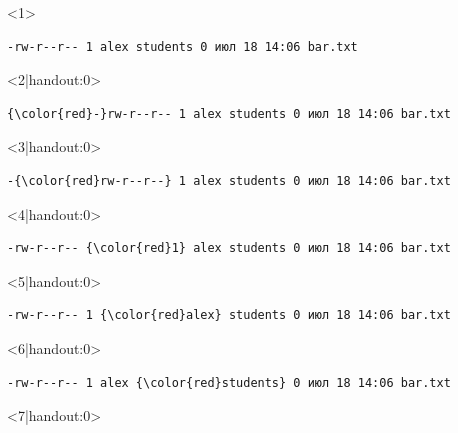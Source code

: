 \documentclass{beamer}
\begin{document}
\begin{frame}[fragile]
	\begin{onlyenv}
		\begin{Verbatim}[commandchars=\\\{\},codes={\catcode`$=3\catcode`^=7\catcode`_=8}]
-rw-r--r-- 1 alex students 0 июл 18 14:06 bar.txt
		\end{Verbatim}
	\end{onlyenv}
	\begin{onlyenv}<2|handout:0>
		\begin{Verbatim}[commandchars=\\\{\},codes={\catcode`$=3\catcode`^=7\catcode`_=8}]
{\color{red}-}rw-r--r-- 1 alex students 0 июл 18 14:06 bar.txt
		\end{Verbatim}
	\end{onlyenv}
	\begin{onlyenv}<3|handout:0>
		\begin{Verbatim}[commandchars=\\\{\},codes={\catcode`$=3\catcode`^=7\catcode`_=8}]
-{\color{red}rw-r--r--} 1 alex students 0 июл 18 14:06 bar.txt
		\end{Verbatim}
	\end{onlyenv}
	\begin{onlyenv}<4|handout:0>
		\begin{Verbatim}[commandchars=\\\{\},codes={\catcode`$=3\catcode`^=7\catcode`_=8}]
-rw-r--r-- {\color{red}1} alex students 0 июл 18 14:06 bar.txt
		\end{Verbatim}
	\end{onlyenv}
	\begin{onlyenv}<5|handout:0>
		\begin{Verbatim}[commandchars=\\\{\},codes={\catcode`$=3\catcode`^=7\catcode`_=8}]
-rw-r--r-- 1 {\color{red}alex} students 0 июл 18 14:06 bar.txt
		\end{Verbatim}
	\end{onlyenv}
	\begin{onlyenv}<6|handout:0>
		\begin{Verbatim}[commandchars=\\\{\},codes={\catcode`$=3\catcode`^=7\catcode`_=8}]
-rw-r--r-- 1 alex {\color{red}students} 0 июл 18 14:06 bar.txt
		\end{Verbatim}
	\end{onlyenv}
	\begin{onlyenv}<7|handout:0>
		\begin{Verbatim}[commandchars=\\\{\},codes={\catcode`$=3\catcode`^=7\catcode`_=8}]

\end{Verbatim}
\end{onlyenv}
\end{frame}
\end{document}
